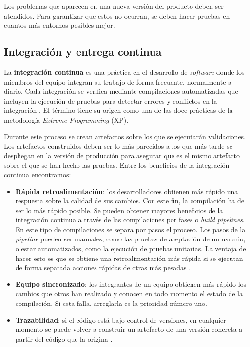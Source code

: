\documentclass[11pt,spanish,listoffigures]{tfgetsinf}
\begin{document}
Los problemas que aparecen en una nueva versión del producto deben ser atendidos. Para garantizar que estos no ocurran, se deben hacer pruebas en cuantos más entornos posibles mejor.

\subsection{Integración y entrega continua}

La \textbf{integración continua} es una práctica en el desarrollo de \textit{software} donde los miembros del equipo integran su trabajo de forma frecuente, normalmente a diario. Cada integración se verifica mediante compilaciones automatizadas que incluyen la ejecución de pruebas para detectar errores y conflictos en la integración \cite{Fowler2006}. El término tiene su origen como una de las doce prácticas de la metodología \textit{Extreme Programming} (XP).

Durante este proceso se crean artefactos sobre los que se ejecutarán validaciones. Los artefactos construidos deben ser lo más parecidos a los que más tarde se despliegan en la versión de producción para asegurar que es el mismo artefacto sobre el que se han hecho las pruebas. Entre los beneficios de la integración continua encontramos:
 
\begin{itemize}

\item \textbf{Rápida retroalimentación}: los desarrolladores obtienen más rápido una respuesta sobre la calidad de sus cambios. Con este fin, la compilación ha de ser lo más rápido posible. Se pueden obtener mayores beneficios de la integración continua a través de las compilaciones por fases o \textit{build pipelines}. En este tipo de compilaciones se separa por pasos el proceso. Los pasos de la \textit{pipeline} pueden ser manuales, como las pruebas de aceptación de un usuario, o estar automatizados, como la ejecución de pruebas unitarias. La ventaja de hacer esto es que se obtiene una retroalimentación más rápida si se ejecutan de forma separada acciones rápidas de otras más pesadas \cite{Fowler2006}.

\item \textbf{Equipo sincronizado}: los integrantes de un equipo obtienen más rápido los cambios que otros han realizado y conocen en todo momento el estado de la compilación. Si esta falla, arreglarla es la prioridad número uno.

\item \textbf{Trazabilidad}: si el código está bajo control de versiones, en cualquier momento se puede volver a construir un artefacto de una versión concreta a partir del código que la origina \cite{Newman2015a}.

\end{itemize}
\end{document}

